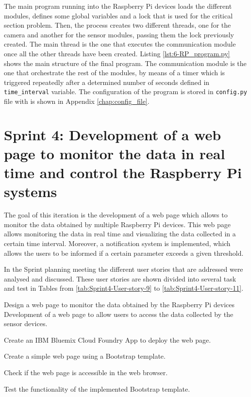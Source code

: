 

The main program running into the Raspberry Pi devices loads the different modules, defines some global variables and a lock that is used for the critical section problem. Then, the process creates two different threads, one for the camera and another for the sensor modules, passing them the lock previously created. The main thread is the one that executes the communication module once all the other threads have been created. Listing \ref{lst:6-RP_program.py} shows the main structure of the final program. The communication module is the one that orchestrate the rest of the modules, by means of a timer which is triggered repeatedly after a determined number of seconds defined in \texttt{time\_interval} variable. The configuration of the program is stored in \texttt{config.py} file with is shown in Appendix \ref{chap:config_file}.





\section{Sprint 4: Development of a web page to monitor the data in real time and control the Raspberry Pi systems}
The goal of this iteration is the development of a web page which allows to monitor the data obtained by multiple Raspberry Pi devices. This web page allows monitoring the data in real time and visualizing the data collected in a certain time interval. Moreover, a notification system is implemented, which allows the users to be informed if a certain parameter exceeds a given threshold.

In the Sprint planning meeting the different user stories that are addressed were analysed and discussed. These user stories  are shown divided into several task and test in Tables from \ref{tab:Sprint4-User-story-9} to \ref{tab:Sprint4-User-story-11}.

{Design a web page to monitor the data obtained by the Raspberry Pi devices}
{Development of a web page to allow users to access the data collected by the sensor devices.}
{	\item Create an IBM Bluemix Cloud Foundry App to deploy the web page.
	\item Create a simple web page using a Bootstrap template.
}{	\item Check if the web page is accessible in the web browser.
	\item Test the functionality of the implemented Bootstrap template.
}

